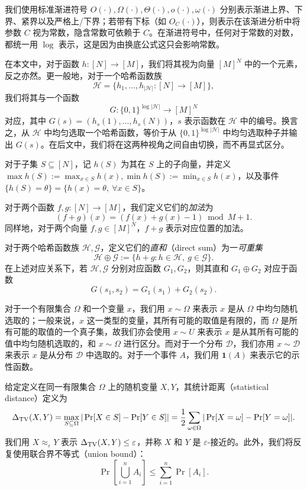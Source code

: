 我们使用标准渐进符号 $O(\cdot),\Omega(\cdot),\Theta(\cdot),o(\cdot),\omega(\cdot)$ 分别表示渐进上界、下界、紧界以及严格上/下界；若带有下标（如 $O_C(\cdot)$），则表示在该渐进分析中将参数 $C$ 视为常数，隐含常数可依赖于 $C$。在渐进符号中，任何对于常数的对数，都统一用 $\log$ 表示，这是因为由换底公式这只会影响常数。

在本文中，对于函数 $h:[N]\to[M]$，我们将其视为向量 $[M]^N$ 中的一个元素，反之亦然。更一般地，对于一个哈希函数族
$$
\mathcal{H} = \{h_1, \ldots, h_{|\mathcal{H}|} : [N] \to [M]\},
$$
我们将其与一个函数
$$
G : \{0,1\}^{\log |\mathcal{H}|} \to [M]^N
$$
对应，其中 $G(s) = (h_s(1), \ldots, h_s(N))$，$s$ 表示函数在 $\mathcal{H}$ 中的编号。换言之，从 $\mathcal{H}$ 中均匀选取一个哈希函数，等价于从 $\{0,1\}^{\log |\mathcal{H}|}$ 中均匀选取种子并输出 $G(s)$。在后文中，我们将在这两种视角之间自由切换，而不再显式区分。

对于子集 $S \subseteq [N]$，记 $h(S)$ 为其在 $S$ 上的子向量，并定义 $\max h(S):=\max_{x\in S}h(x), \min h(S):=\min_{x\in S}h(x)$，以及事件 $\{h(S)=\theta\} = \{h(x)=\theta,\ \forall x\in S\}$。

对于两个函数 $f, g : [N] \to [M]$，我们定义它们的\emph{加法}为
$$
(f + g)(x) = (f(x) + g(x) - 1) \bmod M + 1.
$$
同样地，对于两个向量 $f, g \in [M]^N$，$f + g$ 表示对应位置的加法。

对于两个哈希函数族 $\mathcal{H}, \mathcal{G}$，定义它们的\emph{直和}（direct sum）为一\emph{可重集}
$$
\mathcal{H} \oplus \mathcal{G} := \{h + g : h \in \mathcal{H},\ g \in \mathcal{G}\}.
$$
在上述对应关系下，若 $\mathcal{H}, \mathcal{G}$ 分别对应函数 $G_1, G_2$，则其直和 $G_1 \oplus G_2$ 对应于函数
$$
G(s_1, s_2) = G_1(s_1) + G_2(s_2).
$$

对于一个有限集合 $\Omega$ 和一个变量 $x$，我们用 $x \sim \Omega$ 来表示 $x$ 是从 $\Omega$ 中均匀随机选取的；一般来说，$x$ 这一类型的变量，其所有可能的取值是有限的，而 $\Omega$ 是所有可能的取值的一个真子集，故我们亦会使用 $x \sim U$ 来表示 $x$ 是从其所有可能的值中均匀随机选取的，和 $x \sim \Omega$ 进行区分。而对于一个分布 $\mathcal{D}$，我们亦用 $x \sim \mathcal{D}$ 来表示 $x$ 是从分布 $\mathcal{D}$ 中选取的。对于一个事件 $A$，我们用 $\mathbf{1}(A)$ 来表示它的示性函数。

给定定义在同一有限集合 $\Omega$ 上的随机变量 $X,Y$，其统计距离（statistical distance）定义为
$$
\Delta_{\mathrm{TV}}(X,Y)
= \max_{S\subseteq \Omega} |\Pr[X\in S]-\Pr[Y\in S]|
= \frac{1}{2}\sum_{\omega\in\Omega} |\Pr[X=\omega]-\Pr[Y=\omega]|.
$$
我们用 $X \approx_\varepsilon Y$ 表示 $\Delta_{\mathrm{TV}}(X,Y)\le\varepsilon$，并称 $X$ 和 $Y$ 是 $\varepsilon$-接近的。此外，我们将反复使用联合界不等式（union bound）：
$$
\Pr\left[\bigcup_{i=1}^n A_i\right]\le \sum_{i=1}^n \Pr[A_i].
$$


